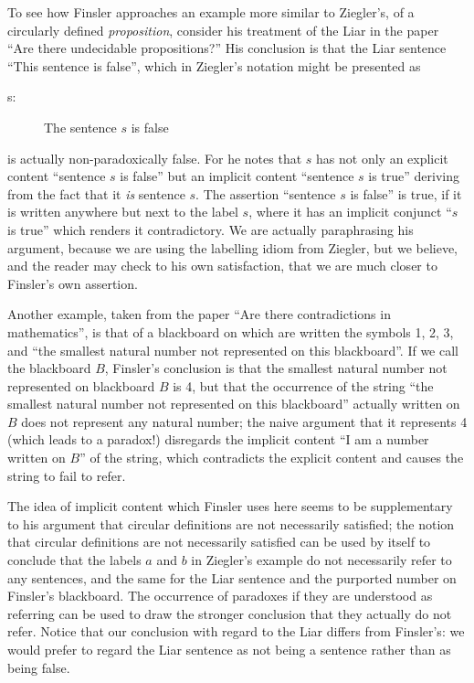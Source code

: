 To see how Finsler approaches an example more similar to Ziegler's, of
a circularly defined {\em proposition\/}, consider his treatment of
the Liar in the paper ``Are there undecidable propositions?''  His
conclusion is that the Liar sentence ``This sentence is false'', which
in Ziegler's notation might be presented as

\begin{description}
\item[s:] The sentence $s$ is false
\end{description}

is actually non-paradoxically false.  For he notes that $s$ has not
only an explicit content ``sentence $s$ is false'' but an implicit
content ``sentence $s$ is true'' deriving from the fact that it {\em
is\/} sentence $s$.  The assertion ``sentence $s$ is false'' is true,
if it is written anywhere but next to the label $s$, where it has an
implicit conjunct ``$s$ is true'' which renders it contradictory.  We
are actually paraphrasing his argument, because we are using the
labelling idiom from Ziegler, but we believe, and the reader may check
to his own satisfaction, that we are much closer to Finsler's own
assertion. 

Another example, taken from the paper ``Are there contradictions in
mathematics'', is that of a blackboard on which are written the
symbols 1, 2, 3, and ``the smallest natural number not represented on
this blackboard''.  If we call the blackboard $B$, Finsler's
conclusion is that the smallest natural number not represented on
blackboard $B$ is 4, but that the occurrence of the string ``the
smallest natural number not represented on this blackboard'' actually
written on $B$ does not represent any natural number; the naive
argument that it represents 4 (which leads to a paradox!) disregards
the implicit content ``I am a number written on $B$'' of the string,
which contradicts the explicit content and causes the string to fail
to refer.

The idea of implicit content which Finsler uses here seems to be
supplementary to his argument that circular definitions are not
necessarily satisfied; the notion that circular definitions are not
necessarily satisfied can be used by itself to conclude that the
labels $a$ and $b$ in Ziegler's example do not necessarily refer to
any sentences, and the same for the Liar sentence and the purported
number on Finsler's blackboard.  The occurrence of paradoxes if they
are understood as referring can be used to draw the stronger
conclusion that they actually do not refer.  Notice that our
conclusion with regard to the Liar differs from Finsler's: we would
prefer to regard the Liar sentence as not being a sentence rather than
as being false.


